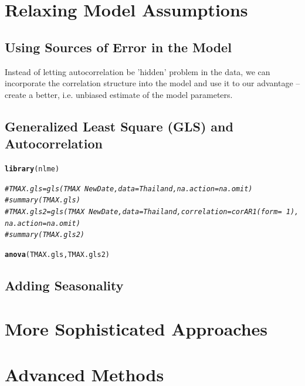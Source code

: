 \documentclass{article}\usepackage[]{graphicx}\usepackage[]{color}
\makeatletter
\newcommand{\hlcom}[1]{\textcolor[rgb]{0.678,0.584,0.686}{\textit{#1}}}%
\newcommand{\hlstd}[1]{\textcolor[rgb]{0.345,0.345,0.345}{#1}}%
\newcommand{\hlkwd}[1]{\textcolor[rgb]{0.737,0.353,0.396}{\textbf{#1}}}%
\newenvironment{kframe}{%
 \def\at@end@of@kframe{}%
 \ifinner\ifhmode%
  \def\at@end@of@kframe{\end{minipage}}%
  \begin{minipage}{\columnwidth}%
 \fi\fi%
 \def\FrameCommand##1{\hskip\@totalleftmargin \hskip-\fboxsep
 \colorbox{shadecolor}{##1}\hskip-\fboxsep
     \hskip-\linewidth \hskip-\@totalleftmargin \hskip\columnwidth}%
 \MakeFramed {\advance\hsize-\width
   \@totalleftmargin\z@ \linewidth\hsize
   \@setminipage}}%
 {\par\unskip\endMakeFramed%
 \at@end@of@kframe}
\newenvironment{knitrout}{}{} %
\makeatother
\begin{document}
\section{Relaxing Model Assumptions}

\subsection{Using Sources of Error in the Model}

Instead of letting autocorrelation be 'hidden' problem in the data, we can incorporate the correlation structure into the model and use it to our advantage -- create a better, i.e. unbiased estimate of the model parameters.

\subsection{Generalized Least Square (GLS) and Autocorrelation}

\begin{knitrout}
\color{fgcolor}\begin{kframe}
\begin{alltt}
\hlkwd{library}\hlstd{(nlme)}

\hlcom{#TMAX.gls = gls(TMAX ~ NewDate, data = Thailand, na.action=na.omit)}
\hlcom{#summary(TMAX.gls)}
\hlcom{#TMAX.gls2 = gls(TMAX ~ NewDate, data = Thailand, correlation = corAR1(form=~1), na.action=na.omit)}
\hlcom{#summary(TMAX.gls2)}

\hlkwd{anova}\hlstd{(TMAX.gls, TMAX.gls2)}
\end{alltt}


{\ttfamily\noindent\bfseries\color{errorcolor}{\#\# Error in anova(TMAX.gls, TMAX.gls2): object 'TMAX.gls' not found}}\end{kframe}
\end{knitrout}


\subsection{Adding Seasonality}


\section{More Sophisticated Approaches}

\section{Advanced Methods}
\end{document}
